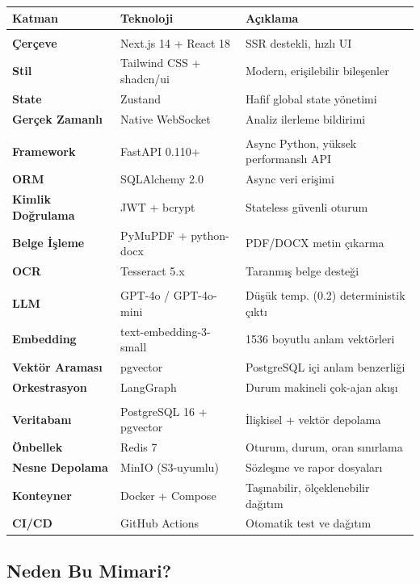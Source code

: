 \documentclass[12pt,a4paper]{article}
\begin{document}
\begin{longtable}{>{\bfseries}p{3.5cm} p{4.5cm} p{5.5cm}}
\toprule
\textbf{Katman} & \textbf{Teknoloji} & \textbf{Açıklama} \\
\midrule
\endhead
\multicolumn{3}{l}{\color{primary}\textbf{Frontend}} \\[2pt]
Çerçeve & Next.js 14 + React 18 & SSR destekli, hızlı UI \\
Stil & Tailwind CSS + shadcn/ui & Modern, erişilebilir bileşenler \\
State & Zustand & Hafif global state yönetimi \\
Gerçek Zamanlı & Native WebSocket & Analiz ilerleme bildirimi \\
\midrule
\multicolumn{3}{l}{\color{primary}\textbf{Backend}} \\[2pt]
Framework & FastAPI 0.110+ & Async Python, yüksek performanslı API \\
ORM & SQLAlchemy 2.0 & Async veri erişimi \\
Kimlik Doğrulama & JWT + bcrypt & Stateless güvenli oturum \\
Belge İşleme & PyMuPDF + python-docx & PDF/DOCX metin çıkarma \\
OCR & Tesseract 5.x & Taranmış belge desteği \\
\midrule
\multicolumn{3}{l}{\color{primary}\textbf{Yapay Zeka}} \\[2pt]
LLM & GPT-4o / GPT-4o-mini & Düşük temp. (0.2) deterministik çıktı \\
Embedding & text-embedding-3-small & 1536 boyutlu anlam vektörleri \\
Vektör Araması & pgvector & PostgreSQL içi anlam benzerliği \\
Orkestrasyon & LangGraph & Durum makineli çok-ajan akışı \\
\midrule
\multicolumn{3}{l}{\color{primary}\textbf{Altyapı}} \\[2pt]
Veritabanı & PostgreSQL 16 + pgvector & İlişkisel + vektör depolama \\
Önbellek & Redis 7 & Oturum, durum, oran sınırlama \\
Nesne Depolama & MinIO (S3-uyumlu) & Sözleşme ve rapor dosyaları \\
Konteyner & Docker + Compose & Taşınabilir, ölçeklenebilir dağıtım \\
CI/CD & GitHub Actions & Otomatik test ve dağıtım \\
\bottomrule
\end{longtable}

\subsection{Neden Bu Mimari?}
\end{document}
